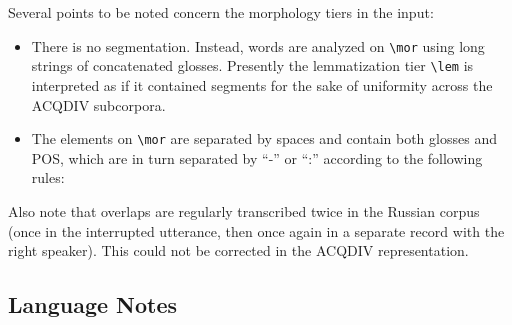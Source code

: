 \documentclass[a4paper, 11pt]{book}
\newcommand{\bks}{\textbackslash}	%
\begin{document}
Several points to be noted concern the morphology tiers in the input: 

\begin{itemize}
	\item There is no segmentation. Instead, words are analyzed on \texttt{\bks mor} using long strings of concatenated glosses. 
		Presently the lemmatization tier \texttt{\bks lem} is interpreted as if it contained segments for the sake of uniformity across
		the ACQDIV subcorpora. 
	\item The elements on \texttt{\bks mor} are separated by spaces and contain both glosses and POS, which are in turn separated by “-” or “:” 
		according to the following rules:
\end{itemize}

Also note that overlaps are regularly transcribed twice in the Russian corpus (once in the interrupted utterance, then once again in a separate record with the
right speaker). This could not be corrected in the ACQDIV representation. %

%


\subsection{Language Notes}
\end{document}
